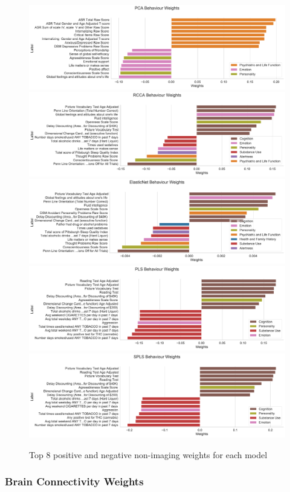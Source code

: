 \begin{figure}
\centering
\includegraphics[width=0.8\linewidth]{figures/hcp/PCA behaviour weights}
\includegraphics[width=0.8\linewidth]{figures/hcp/RCCA behaviour weights}
\includegraphics[width=0.8\linewidth]{figures/hcp/ElasticNet behaviour weights}
\includegraphics[width=0.8\linewidth]{figures/hcp/PLS behaviour weights}
\includegraphics[width=0.8\linewidth]{figures/hcp/SPLS behaviour weights}
\caption{Top 8 positive and negative non-imaging \gls{weights} for each model}\label{fig:behaviour}
\end{figure}

\subsubsection{Brain Connectivity Weights}

